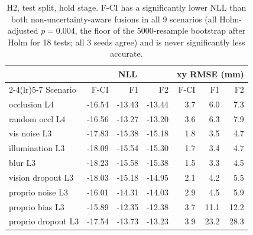 \begin{table}[t]\centering\small\begin{tabular}{lrrrrrr}\toprule
 & \multicolumn{3}{c}{NLL} & \multicolumn{3}{c}{xy RMSE (mm)} \\\cmidrule(lr){2-4}\cmidrule(lr){5-7}
Scenario & F-CI & F1 & F2 & F-CI & F1 & F2 \\\midrule
occlusion L4 & -16.54 & -13.43 & -13.44 & 3.7 & 6.0 & 7.3 \\
random occl L4 & -16.56 & -13.27 & -13.20 & 3.6 & 6.3 & 7.9 \\
vis noise L3 & -17.83 & -15.38 & -15.18 & 1.8 & 3.5 & 4.7 \\
illumination L3 & -18.09 & -15.54 & -15.30 & 1.7 & 3.4 & 4.7 \\
blur L3 & -18.23 & -15.58 & -15.38 & 1.5 & 3.3 & 4.5 \\
vision dropout L3 & -18.03 & -15.18 & -14.95 & 2.1 & 4.2 & 5.5 \\
proprio noise L3 & -16.01 & -14.31 & -14.03 & 2.9 & 4.5 & 5.9 \\
proprio bias L3 & -15.89 & -12.35 & -12.38 & 3.7 & 11.1 & 12.2 \\
proprio dropout L3 & -17.54 & -13.73 & -13.23 & 3.9 & 23.2 & 28.3 \\
\bottomrule\end{tabular}\caption{H2, test split, hold stage. F-CI has a significantly lower NLL than both non-uncertainty-aware fusions in all 9 scenarios (all Holm-adjusted $p=0.004$, the floor of the 5000-resample bootstrap after Holm for 18 tests; all 3 seeds agree) and is never significantly less accurate.}\label{tab:h2}\end{table}
